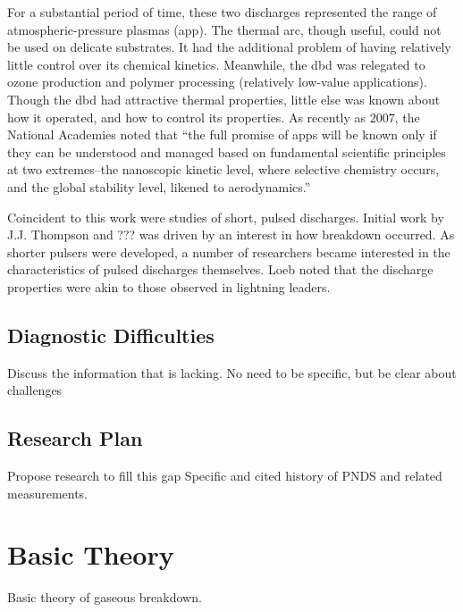 
For a substantial period of time, these two  discharges
represented the range of atmospheric-pressure plasmas (\acs{app}). The thermal
arc, though useful, could not be used on delicate substrates. It had the
additional problem of having relatively little control over its chemical
kinetics. Meanwhile, the \acs{dbd} was relegated to ozone production and polymer
processing (relatively low-value applications). Though the \acs{dbd} had
attractive thermal properties, little else was known about how it operated, and
how to control its properties. As recently as $2007$, the National Academies
noted that ``the full promise of \acs{app}s will be known only if they can be
understood and managed based on fundamental scientific principles at two
extremes--the nanoscopic kinetic level, where selective chemistry occurs, and
the global stability level, likened to aerodynamics.''

Coincident to this work were studies of short, pulsed discharges. Initial work
by J.J. Thompson and ???  was driven by an interest in
how breakdown occurred. As shorter pulsers were developed, a number of
researchers became interested in the characteristics of pulsed discharges
themselves. Loeb  noted that the discharge properties were akin
to those observed in lightning leaders. 


\subsection{Diagnostic Difficulties}

Discuss the information that is lacking. No need to be specific, but be clear
about challenges

\subsection{Research Plan}

Propose research to fill this gap
Specific and cited history of PNDS and related measurements.

\section{Basic Theory}

Basic theory of gaseous breakdown.
